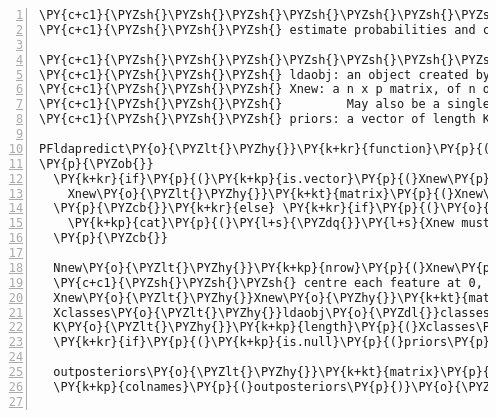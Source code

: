 \begin{Verbatim}[commandchars=\\\{\},codes={\catcode`\$=3\catcode`\^=7\catcode`\_=8},gobble=0,numbers=left,fontfamily=fvm,fontshape=n,fontsize=\footnotesize,tabsize=2]
\PY{c+c1}{\PYZsh{}\PYZsh{}\PYZsh{}\PYZsh{}\PYZsh{}\PYZsh{}\PYZsh{} FUNCTION: PFldapredict()}
\PY{c+c1}{\PYZsh{}\PYZsh{}\PYZsh{} estimate probabilities and class of new inputs}

\PY{c+c1}{\PYZsh{}\PYZsh{}\PYZsh{}\PYZsh{}\PYZsh{}\PYZsh{}\PYZsh{} input:}
\PY{c+c1}{\PYZsh{}\PYZsh{}\PYZsh{} ldaobj: an object created by createPFldaobj()}
\PY{c+c1}{\PYZsh{}\PYZsh{}\PYZsh{} Xnew: a n x p matrix, of n obs and p variables. }
\PY{c+c1}{\PYZsh{}\PYZsh{}\PYZsh{}         May also be a single numeric vector (n=1) of length p}
\PY{c+c1}{\PYZsh{}\PYZsh{}\PYZsh{} priors: a vector of length K (\PYZsh{}classes) with elements in (0,1)}

PFldapredict\PY{o}{\PYZlt{}\PYZhy{}}\PY{k+kr}{function}\PY{p}{(}ldaobj\PY{p}{,}Xnew\PY{p}{,}priors\PY{o}{=}\PY{k+kc}{NULL}\PY{p}{)}
\PY{p}{\PYZob{}}
  \PY{k+kr}{if}\PY{p}{(}\PY{k+kp}{is.vector}\PY{p}{(}Xnew\PY{p}{,}mode\PY{o}{=}\PY{l+s}{\PYZdq{}}\PY{l+s}{numeric\PYZdq{}}\PY{p}{)}\PY{p}{)}\PY{p}{\PYZob{}}
    Xnew\PY{o}{\PYZlt{}\PYZhy{}}\PY{k+kt}{matrix}\PY{p}{(}Xnew\PY{p}{,}nrow\PY{o}{=}\PY{l+m}{1}\PY{p}{)}
  \PY{p}{\PYZcb{}}\PY{k+kr}{else} \PY{k+kr}{if}\PY{p}{(}\PY{o}{!}\PY{k+kp}{is.matrix}\PY{p}{(}Xnew\PY{p}{)}\PY{p}{)}\PY{p}{\PYZob{}}
    \PY{k+kp}{cat}\PY{p}{(}\PY{l+s}{\PYZdq{}}\PY{l+s}{Xnew must be numeric and either a vector or matrix \PYZbs{}n \PYZdq{}}\PY{p}{)}
  \PY{p}{\PYZcb{}}

  Nnew\PY{o}{\PYZlt{}\PYZhy{}}\PY{k+kp}{nrow}\PY{p}{(}Xnew\PY{p}{)}
  \PY{c+c1}{\PYZsh{}\PYZsh{}\PYZsh{} centre each feature at 0, as done on the training data}
  Xnew\PY{o}{\PYZlt{}\PYZhy{}}Xnew\PY{o}{\PYZhy{}}\PY{k+kt}{matrix}\PY{p}{(}\PY{k+kp}{rep}\PY{p}{(}ldaobj\PY{o}{\PYZdl{}}meanadj\PY{p}{,}Nnew\PY{p}{)}\PY{p}{,}nrow\PY{o}{=}Nnew\PY{p}{,}byrow\PY{o}{=}\PY{k+kc}{TRUE}\PY{p}{)}
  Xclasses\PY{o}{\PYZlt{}\PYZhy{}}ldaobj\PY{o}{\PYZdl{}}classes
  K\PY{o}{\PYZlt{}\PYZhy{}}\PY{k+kp}{length}\PY{p}{(}Xclasses\PY{p}{)}
  \PY{k+kr}{if}\PY{p}{(}\PY{k+kp}{is.null}\PY{p}{(}priors\PY{p}{)}\PY{p}{)} priors\PY{o}{\PYZlt{}\PYZhy{}}ldaobj\PY{o}{\PYZdl{}}prior
  
  outposteriors\PY{o}{\PYZlt{}\PYZhy{}}\PY{k+kt}{matrix}\PY{p}{(}\PY{l+m}{0}\PY{p}{,}nrow\PY{o}{=}Nnew\PY{p}{,}ncol\PY{o}{=}K\PY{p}{)}
  \PY{k+kp}{colnames}\PY{p}{(}outposteriors\PY{p}{)}\PY{o}{\PYZlt{}\PYZhy{}}Xclasses
  

\end{Verbatim}
